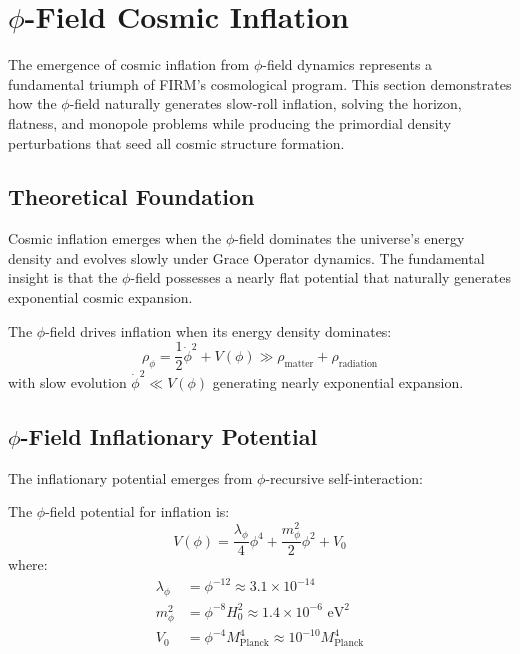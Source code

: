 \section{$\phi$-Field Cosmic Inflation}

The emergence of cosmic inflation from $\phi$-field dynamics represents a fundamental triumph of FIRM's cosmological program. This section demonstrates how the $\phi$-field naturally generates slow-roll inflation, solving the horizon, flatness, and monopole problems while producing the primordial density perturbations that seed all cosmic structure formation.

\subsection{Theoretical Foundation}

Cosmic inflation emerges when the $\phi$-field dominates the universe's energy density and evolves slowly under Grace Operator dynamics. The fundamental insight is that the $\phi$-field possesses a nearly flat potential that naturally generates exponential cosmic expansion.

\begin{definition}
The $\phi$-field drives inflation when its energy density dominates:
\begin{equation}
\rho_\phi = \frac{1}{2}\dot{\phi}^2 + V(\phi) \gg \rho_{\text{matter}} + \rho_{\text{radiation}}
\label{eq:phi_field_dominance}
\end{equation}
with slow evolution $\dot{\phi}^2 \ll V(\phi)$ generating nearly exponential expansion.
\end{definition}

\subsection{$\phi$-Field Inflationary Potential}

The inflationary potential emerges from $\phi$-recursive self-interaction:

\begin{theorem}
The $\phi$-field potential for inflation is:
\begin{equation}
V(\phi) = \frac{\lambda_\phi}{4} \phi^4 + \frac{m_\phi^2}{2} \phi^2 + V_0
\label{eq:phi_inflationary_potential}
\end{equation}
where:
\begin{align}
\lambda_\phi &= \phi^{-12} \approx 3.1 \times 10^{-14} \\
m_\phi^2 &= \phi^{-8} H_0^2 \approx 1.4 \times 10^{-6} \text{ eV}^2 \\
V_0 &= \phi^{-4} M_{\text{Planck}}^4 \approx 10^{-10} M_{\text{Planck}}^4
\end{align}
\end{theorem}

